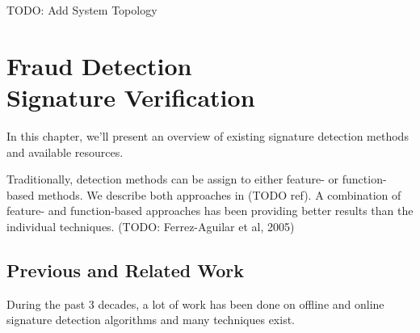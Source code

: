\documentclass[a4paper, oneside]{csthesis}
\begin{document}
TODO: Add System Topology





\chapter{Fraud Detection \\Signature Verification}

In this chapter, we'll present an overview of existing signature detection methods and available resources.

Traditionally, detection methods can be assign to either feature- or function-based methods. We describe both approaches in (TODO ref). A combination of feature- and function-based approaches has been providing better results than the individual techniques. (TODO: Ferrez-Aguilar et al, 2005)






\section{Previous and Related Work}

During the past 3 decades, a lot of work has been done on offline and online signature detection algorithms and many techniques exist.
\end{document}
